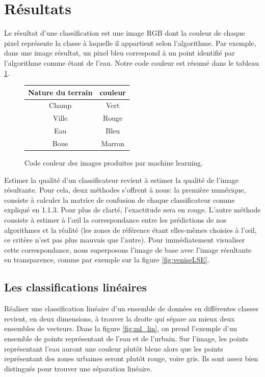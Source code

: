 \documentclass[a4paper,10pt]{article}
\begin{document}
\section{Résultats}
Le résultat d'une classification est une image RGB dont la couleur de chaque pixel représente la classe à laquelle il appartient selon l'algorithme. Par exemple, dans une image résultat, un pixel bleu correspond à un point identifié par l'algorithme comme étant de l'eau. Notre code couleur est résumé dans le tableau \ref{table:codeCouleur}.
\begin{figure}[H]
 \begin{center}
  \begin{tabular}{|c|c|}
    \hline
    Nature du terrain & couleur \\
    \hline
  Champ & Vert \\
  Ville &  Rouge \\
  Eau &  Bleu \\
  Boue & Marron \\
    \hline
  \end{tabular}
\caption{Code couleur des images produites par machine learning.} 
\label{table:codeCouleur}
\end{center}
\end{figure}
Estimer la qualité d'un classificateur revient à estimer la qualité de l'image résultante. Pour cela, deux méthodes s'offrent à nous: la première numérique, consiste à calculer la matrice de confusion de chaque classificateur comme expliqué en 1.1.3. Pour plus de clarté, l'exactitude sera en rouge. L'autre méthode consiste à estimer à l'œil la correspondance entre les prédictions de nos algorithmes et la réalité (les zones de référence étant elles-mêmes choisies à l'œil, ce critère n'est pas plus mauvais que l'autre). Pour immédiatement visualiser cette correspondance, nous superposons l'image de base avec l'image résultante en transparence, comme par exemple sur la figure \ref{fig:veniseLSE}.

 \subsection{Les classifications linéaires}
 
 Réaliser une classification linéaire d'un ensemble de données en différentes classes revient, en deux dimensions, à trouver la droite qui sépare au mieux deux ensembles de vecteurs. Dans la figure \ref{fig:ml_lin}, on prend l'exemple d'un ensemble de points représentant de l'eau et de l'urbain. Sur l'image, les points représentant l'eau auront une couleur plutôt bleue alors que les points représentant des zones urbaines seront plutôt rouge, voire gris. Ils sont assez bien distingués pour trouver une séparation linéaire.
\end{document}

